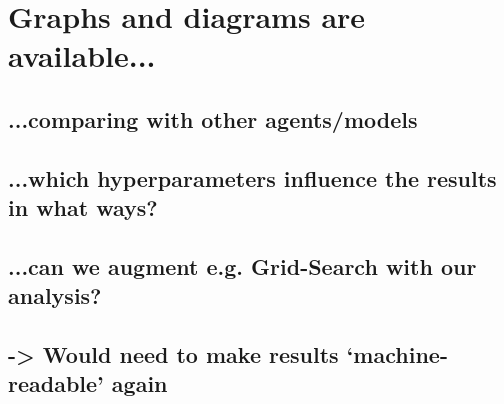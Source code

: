 \label{ch:InterpretResults}
\section*{Graphs and diagrams are available...}
\subsection*{...comparing with other agents/models}
\subsection*{...which hyperparameters influence the results in what ways?}
\subsection*{...can we augment e.g. Grid-Search with our analysis?}
\subsection*{-> Would need to make results `machine-readable' again}

